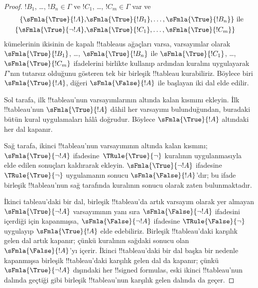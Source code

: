 \documentclass[../../../include/open-logic-section]{subfiles}
\begin{document}
\begin{proof}
  $!B_1$, \dots, $!B_n \in \Gamma$ ve $!C_1$, \dots,
  $!C_m \in \Gamma$ var ve
  \begin{align*}
    \{\sFmla{\True}{!A}, &
    \sFmla{\True}{!B_1}, \dots, \sFmla{\True}{!B_n}\} \text{ ile}\\
    \{\sFmla{\True}{\lnot !A}, &
    \sFmla{\True}{!C_1}, \dots, \sFmla{\True}{!C_m}\}
  \end{align*}
  kümelerinin ikisinin de kapalı !!{tableau}s ağaçları varsa, varsayımlar
  olarak $\sFmla{\True}{!B_1}$, \dots, $\sFmla{\True}{!B_n}$ ile
  $\sFmla{\True}{!C_1}$, \dots, $\sFmla{\True}{!C_m}$ ifadelerini birlikte
  kullanıp ardından \Cut{} kuralını uygulayarak $\Gamma$'nın tutarsız
  olduğunu gösteren tek bir birleşik !!{tableau} kurabiliriz. Böylece biri
  $\sFmla{\True}{!A}$, diğeri $\sFmla{\False}{!A}$ ile başlayan iki dal
  elde edilir.
  
  Sol tarafa, ilk !!{tableau}'nun varsayımlarının altında kalan kısmını
  ekleyin. İlk !!{tableau}'nun $\sFmla{\True}{!A}$ dâhil her varsayımı
  bulunduğundan, buradaki bütün kural uygulamaları hâlâ doğrudur. Böylece
  $\sFmla{\True}{!A}$ altındaki her dal kapanır.
  
  Sağ tarafa, ikinci !!{tableau}'nun varsayımının altında kalan kısmını;
  $\sFmla{\True}{\lnot !A}$ ifadesine~$\TRule{\True}{\lnot}$ kuralının
  uygulanmasıyla elde edilen sonuçları kaldırarak ekleyin.
  $\sFmla{\True}{\lnot !A}$ ifadesine $\TRule{\True}{\lnot}$ uygulamanın
  sonucu $\sFmla{\False}{!A}$'dır; bu ifade birleşik !!{tableau}'nun sağ
  tarafında \Cut{} kuralının sonucu olarak zaten bulunmaktadır.

  İkinci tableau'daki bir dal, birleşik !!{tableau}'da artık varsayım olarak
  yer almayan $\sFmla{\True}{\lnot !A}$ varsayımının yanı sıra
  $\sFmla{\False}{\lnot !A}$ ifadesini içerdiği için kapanmışsa,
  $\sFmla{\False}{\lnot !A}$ ifadesine $\TRule{\False}{\lnot}$ uygulayıp
  $\sFmla{\True}{!A}$ elde edebiliriz. Birleşik !!{tableau}'daki karşılık
  gelen dal artık kapanır; çünkü \Cut{} kuralının sağdaki sonucu olan
  $\sFmla{\False}{!A}$'yı içerir. İkinci !!{tableau}'daki bir dal başka bir
  nedenle kapanmışsa birleşik !!{tableau}'daki karşılık gelen dal da
  kapanır; çünkü $\sFmla{\True}{\lnot !A}$ dışındaki her !!{signed formula}s,
  eski ikinci !!{tableau}'nun dalında geçtiği gibi birleşik !!{tableau}'nun
  karşılık gelen dalında da geçer.
  \end{proof}
\end{document}
